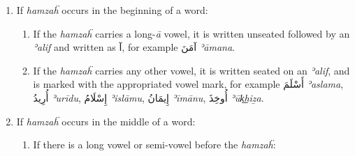 \documentclass[
  10pt,
]{book}
\providecommand{\tightlist}{%
  \setlength{\itemsep}{0pt}\setlength{\parskip}{0pt}}
\begin{document}
\begin{enumerate}
\def\labelenumi{\arabic{enumi}.}
\tightlist
\item
  If \emph{hamzaḧ} occurs in the beginning of a word:

  \begin{enumerate}
  \def\labelenumii{\alph{enumii}.}
  \tightlist
  \item
    If the \emph{hamzaḧ} carries a long-\emph{ā} vowel, it is written unseated followed by an \emph{ʾalif} and written as \foreignlanguage{arabic}{آ}, for example \foreignlanguage{arabic}{آمَنَ} \emph{ʾāmana}.
  \item
    If the \emph{hamzaḧ} carries any other vowel, it is written seated on an \emph{ʾalif}, and is marked with the appropriated vowel mark, for example \foreignlanguage{arabic}{أَسْلَمَ} \emph{ʾaslama}, \foreignlanguage{arabic}{أُرِيدُ} \emph{ʾurīdu}, \foreignlanguage{arabic}{إِسْلَامُ} \emph{ʾislāmu}, \foreignlanguage{arabic}{إِيمَانُ} \emph{ʾīmānu}, \foreignlanguage{arabic}{أُوخِذَ} \emph{ʾūk͟hiẕa}.
  \end{enumerate}
\item
  If \emph{hamzaḧ} occurs in the middle of a word:

  \begin{enumerate}
  \def\labelenumii{\alph{enumii}.}
  \tightlist
  \item
    If there is a long vowel or semi-vowel before the \emph{hamzaḧ}:


\end{enumerate}
\end{enumerate}
\end{document}
